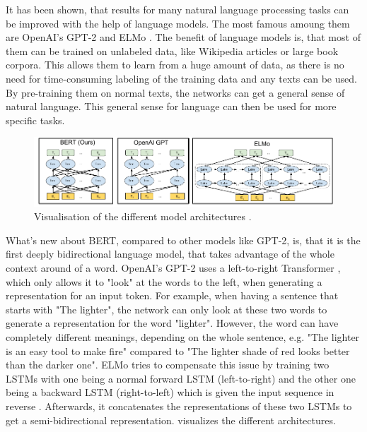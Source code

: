 It has been shown, that results for many natural language processing tasks can be improved with the help of language models.
The most famous amoung them are OpenAI's GPT-2 \cite{radford2019language} and ELMo \cite{1802.05365}.
The benefit of language models is, that most of them can be trained on unlabeled data, like Wikipedia articles or large book corpora.
This allows them to learn from a huge amount of data, as there is no need for time-consuming labeling of the training data and any texts can be used.
By pre-training them on normal texts, the networks can get a general sense of natural language.
This general sense for language can then be used for more specific tasks.

\begin{figure}[h]
\centering
\includegraphics[width=0.7\paperwidth]{figures/bert-gpt2-elmo-model-comparison}
\caption[Visualisation of the different model architectures]{Visualisation of the different model architectures \cite[p.~13]{devlin2018bert}.}
\label{fig:bert-gpt2-elmo-model-comparison}
\end{figure}

What's new about BERT, compared to other models like GPT-2, is, that it is the first deeply bidirectional language model, that takes advantage of the whole context around of a word.
OpenAI's GPT-2 uses a left-to-right Transformer \cite[p.~4]{radford2019language}, which only allows it to "look" at the words to the left, when generating a representation for an input token.
For example, when having a sentence that starts with "The lighter", the network can only look at these two words to generate a representation for the word "lighter".
However, the word can have completely different meanings, depending on the whole sentence, e.g. "The lighter is an easy tool to make fire" compared to "The lighter shade of red looks better than the darker one". 
ELMo tries to compensate this issue by training two LSTMs with one being a normal forward LSTM (left-to-right) and the other one being a backward LSTM (right-to-left) which is given the input sequence in reverse \cite[p.~2--3]{1802.05365}.
Afterwards, it concatenates the representations of these two LSTMs to get a semi-bidirectional representation.
 visualizes the different architectures.

